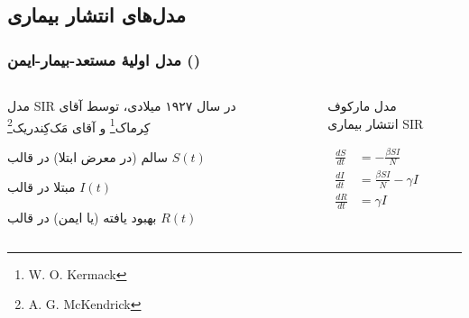 \documentclass[xcolor=dvipsnames, professionalfonts, aspectratio=169, 11pt]{beamer}
\begin{document}
\subsection{مدل‌های انتشار بیماری}
\begin{frame}
    \frametitle{مدل اولیهٔ مستعد-بیمار-ایمن ()}

    \begin{columns}[onlytextwidth]
        \begin{column}{.5\textwidth}
            \begin{moredi}
                \item مدل SIR در سال ۱۹۲۷ میلادی، توسط آقای کِرماک\footnote[frame]{W. O. Kermack} و آقای مَک‌کِندریک\footnote[frame]{A. G. McKendrick}
                \begin{moredi}
                    \item سالم (در معرض ابتلا) در قالب $S(t)$
                    \item مبتلا در قالب $I(t)$
                    \item بهبود یافته (یا ایمن) در قالب $R(t)$
                \end{moredi}
            \end{moredi}
            \vspace{-1em}

        \end{column}
        \begin{column}{.5\textwidth}
            \begin{figure}
                \centering
                \caption{مدل مارکوف انتشار بیماری SIR}
                \label{fig:SIR}
            \end{figure}
            \begin{equation}
                \label{eqn:sir-ode-formulation}
                \begin{aligned}
                    {\frac {dS}{dt}} & =-{\frac {\beta SI}{N}}         \\
                    \frac {dI}{dt}   & ={\frac {\beta SI}{N}}-\gamma I \\
                    \frac {dR}{dt}   & =\gamma I
                \end{aligned}
            \end{equation}
        \end{column}
    \end{columns}

\end{frame}
\end{document}
